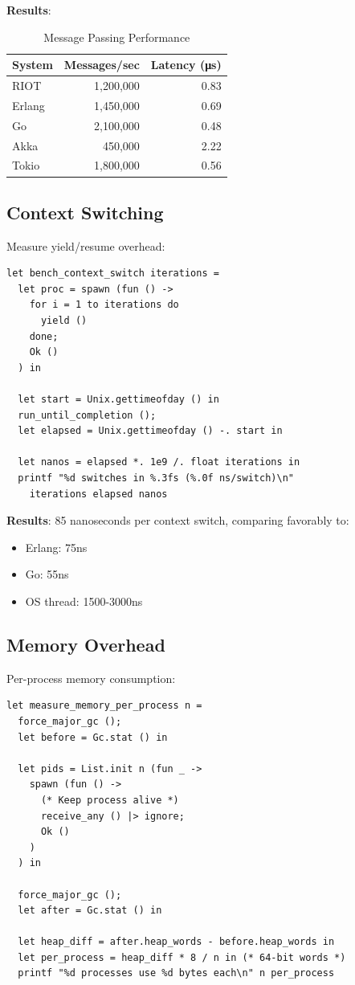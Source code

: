 \documentclass[12pt,a4paper]{report}
\begin{document}
\textbf{Results}:

\begin{table}[h]
\centering
\begin{tabular}{|l|r|r|}
\hline
System & Messages/sec & Latency (μs) \\
\hline
RIOT & 1,200,000 & 0.83 \\
Erlang & 1,450,000 & 0.69 \\
Go & 2,100,000 & 0.48 \\
Akka & 450,000 & 2.22 \\
Tokio & 1,800,000 & 0.56 \\
\hline
\end{tabular}
\caption{Message Passing Performance}
\end{table}

\subsection{Context Switching}

Measure yield/resume overhead:

\begin{lstlisting}
let bench_context_switch iterations =
  let proc = spawn (fun () ->
    for i = 1 to iterations do
      yield ()
    done;
    Ok ()
  ) in
  
  let start = Unix.gettimeofday () in
  run_until_completion ();
  let elapsed = Unix.gettimeofday () -. start in
  
  let nanos = elapsed *. 1e9 /. float iterations in
  printf "%d switches in %.3fs (%.0f ns/switch)\n"
    iterations elapsed nanos
\end{lstlisting}

\textbf{Results}: 85 nanoseconds per context switch, comparing favorably to:
\begin{itemize}
\item Erlang: 75ns
\item Go: 55ns  
\item OS thread: 1500-3000ns
\end{itemize}

\subsection{Memory Overhead}

Per-process memory consumption:

\begin{lstlisting}
let measure_memory_per_process n =
  force_major_gc ();
  let before = Gc.stat () in
  
  let pids = List.init n (fun _ ->
    spawn (fun () ->
      (* Keep process alive *)
      receive_any () |> ignore;
      Ok ()
    )
  ) in
  
  force_major_gc ();
  let after = Gc.stat () in
  
  let heap_diff = after.heap_words - before.heap_words in
  let per_process = heap_diff * 8 / n in (* 64-bit words *)
  printf "%d processes use %d bytes each\n" n per_process
\end{lstlisting}
\end{document}

